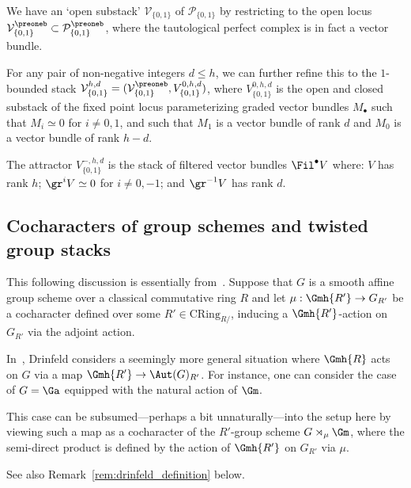 \documentclass[10pt]{amsart}
\begin{document}
\begin{example}
 \label{ex:vect_HT_wts_01_stack}
We have an `open substack' $\mathcal{V}_{\{0,1\}}$ of $\mathcal{P}_{\{0,1\}}$ by restricting to the open locus $\mathcal{V}_{\{0,1\}}^\preoneb\subset \mathcal{P}_{\{0,1\}}^\preoneb$, where the tautological perfect complex is in fact a vector bundle. 

For any pair of non-negative integers $d\leq h$, we can further refine this to the $1$-bounded stack $\mathcal{V}_{\{0,1\}}^{h,d} = (\mathcal{V}_{\{0,1\}}^\preoneb,V^{0,h,d}_{\{0,1\}})$, where $V^{0,h,d}_{\{0,1\}}$ is the open and closed substack of the fixed point locus parameterizing graded vector bundles $M_\bullet$ such that $M_i\simeq 0$ for $i\neq 0,1$, and such that $M_1$ is a vector bundle of rank $d$ and $M_0$ is a vector bundle of rank $h-d$.

The attractor $V^{-,h,d}_{\{0,1\}}$ is the stack of filtered vector bundles $\Fil^\bullet V$ where: $V$ has rank $h$; $\gr^i V\simeq 0$ for $i\neq 0,-1$; and $\gr^{-1}V$ has rank $d$.
\end{example} 

\subsection{Cocharacters of group schemes and twisted group stacks}
\label{subsec:cochar}
This following discussion is essentially from~\cite[\S 2.3]{drinfeld2023shimurian}. Suppose that $G$ is a smooth affine group scheme over a classical commutative ring $R$ and let $\mu: \Gmh{R'}\to G_{R'}$ be a cocharacter defined over some $R'\in \mathrm{CRing}_{R/}$, inducing a $\Gmh{R'}$-action on $G_{R'}$ via the adjoint action.


\begin{remark}
\label{rem:drinfeld_definition_cochars}
In~\cite{drinfeld2023shimurian}, Drinfeld considers a seemingly more general situation where $\Gmh{R}$ acts on $G$ via a map $\Gmh{R'}\to \Aut(G)_{R'}$. For instance, one can consider the case of $G = \Ga$ equipped with the natural action of $\Gm$. 

This case can be subsumed---perhaps a bit unnaturally---into the setup here by viewing such a map as a cocharacter of the $R'$-group scheme $G\rtimes_\mu \Gm$, where the semi-direct product is defined by the action of $\Gmh{R'}$ on $G_{R'}$ via $\mu$.

See also Remark~\ref{rem:drinfeld_definition} below.
\end{remark}
\end{document}
